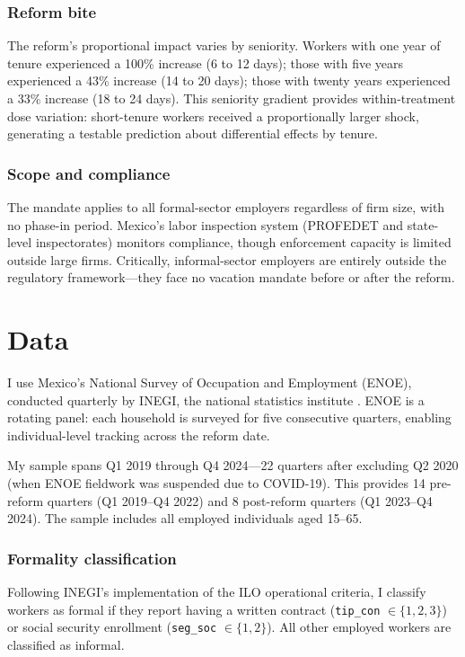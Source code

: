 \documentclass[12pt]{article}
\begin{document}
\subsubsection*{Reform bite} The reform's proportional impact varies by seniority. Workers with one year of tenure experienced a 100\% increase (6 to 12 days); those with five years experienced a 43\% increase (14 to 20 days); those with twenty years experienced a 33\% increase (18 to 24 days). This seniority gradient provides within-treatment dose variation: short-tenure workers received a proportionally larger shock, generating a testable prediction about differential effects by tenure.

\subsubsection*{Scope and compliance} The mandate applies to all formal-sector employers regardless of firm size, with no phase-in period. Mexico's labor inspection system (PROFEDET and state-level inspectorates) monitors compliance, though enforcement capacity is limited outside large firms. Critically, informal-sector employers are entirely outside the regulatory framework---they face no vacation mandate before or after the reform.

\section{Data}

I use Mexico's National Survey of Occupation and Employment (ENOE), conducted quarterly by INEGI, the national statistics institute \citep{inegi_enoe}. ENOE is a rotating panel: each household is surveyed for five consecutive quarters, enabling individual-level tracking across the reform date.

My sample spans Q1 2019 through Q4 2024---22 quarters after excluding Q2 2020 (when ENOE fieldwork was suspended due to COVID-19). This provides 14 pre-reform quarters (Q1 2019--Q4 2022) and 8 post-reform quarters (Q1 2023--Q4 2024). The sample includes all employed individuals aged 15--65.

\subsubsection*{Formality classification} Following INEGI's implementation of the ILO operational criteria, I classify workers as formal if they report having a written contract (\texttt{tip\_con} $\in \{1,2,3\}$) or social security enrollment (\texttt{seg\_soc} $\in \{1,2\}$). All other employed workers are classified as informal.
\end{document}
